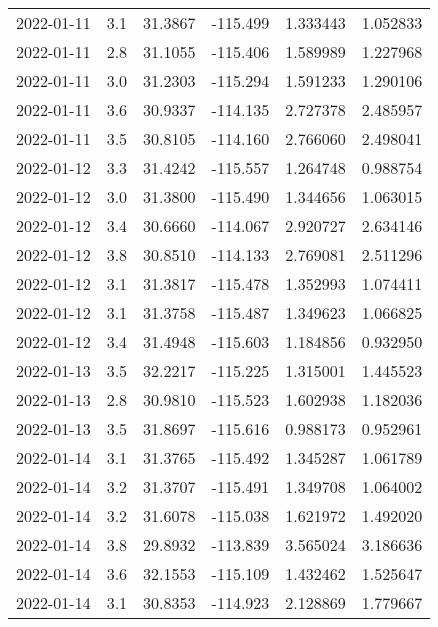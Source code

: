\begin{tabular}{lrrrrr}
2022-01-11 &       3.1 &  31.3867 &  -115.499 &         1.333443 &         1.052833 \\
2022-01-11 &       2.8 &  31.1055 &  -115.406 &         1.589989 &         1.227968 \\
2022-01-11 &       3.0 &  31.2303 &  -115.294 &         1.591233 &         1.290106 \\
2022-01-11 &       3.6 &  30.9337 &  -114.135 &         2.727378 &         2.485957 \\
2022-01-11 &       3.5 &  30.8105 &  -114.160 &         2.766060 &         2.498041 \\
2022-01-12 &       3.3 &  31.4242 &  -115.557 &         1.264748 &         0.988754 \\
2022-01-12 &       3.0 &  31.3800 &  -115.490 &         1.344656 &         1.063015 \\
2022-01-12 &       3.4 &  30.6660 &  -114.067 &         2.920727 &         2.634146 \\
2022-01-12 &       3.8 &  30.8510 &  -114.133 &         2.769081 &         2.511296 \\
2022-01-12 &       3.1 &  31.3817 &  -115.478 &         1.352993 &         1.074411 \\
2022-01-12 &       3.1 &  31.3758 &  -115.487 &         1.349623 &         1.066825 \\
2022-01-12 &       3.4 &  31.4948 &  -115.603 &         1.184856 &         0.932950 \\
2022-01-13 &       3.5 &  32.2217 &  -115.225 &         1.315001 &         1.445523 \\
2022-01-13 &       2.8 &  30.9810 &  -115.523 &         1.602938 &         1.182036 \\
2022-01-13 &       3.5 &  31.8697 &  -115.616 &         0.988173 &         0.952961 \\
2022-01-14 &       3.1 &  31.3765 &  -115.492 &         1.345287 &         1.061789 \\
2022-01-14 &       3.2 &  31.3707 &  -115.491 &         1.349708 &         1.064002 \\
2022-01-14 &       3.2 &  31.6078 &  -115.038 &         1.621972 &         1.492020 \\
2022-01-14 &       3.8 &  29.8932 &  -113.839 &         3.565024 &         3.186636 \\
2022-01-14 &       3.6 &  32.1553 &  -115.109 &         1.432462 &         1.525647 \\
2022-01-14 &       3.1 &  30.8353 &  -114.923 &         2.128869 &         1.779667 \\

\end{tabular}
